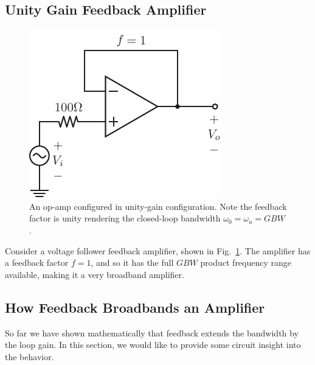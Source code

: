 \subsection{Unity Gain Feedback Amplifier}
\begin{figure}[tb]
\begin{center}
\includegraphics[scale=1]{opamp_unitygain}
\end{center}
\caption{An op-amp configured in unity-gain configuration.  Note the feedback factor is unity rendering the closed-loop bandwidth $\omega_0 = \omega_u = GBW$.}
\label{fig:opamp_unitygain}
\end{figure}
 
Consider a voltage follower feedback amplifier, shown in Fig.~\ref{fig:opamp_unitygain}.  The amplifier has a feedback factor $f = 1$, and so it has the full $GBW$ product frequency range available, making it a very broadband amplifier.
\subsection{How Feedback Broadbands an Amplifier}
So far we have shown mathematically that feedback extends the bandwidth by the loop gain. In this section, we would like to provide some circuit insight into the behavior.
